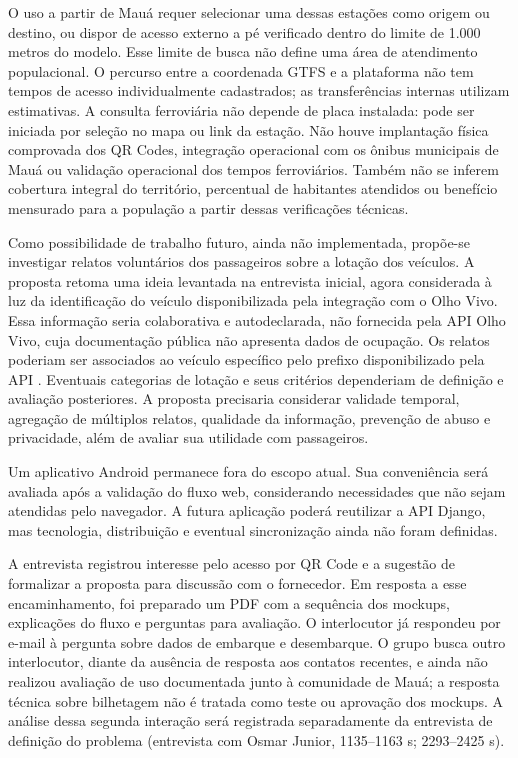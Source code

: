 \documentclass[12pt,oneside,a4paper,brazil,chapter=TITLE]{abntex2}
\begin{document}
O uso a partir de Mauá requer selecionar uma dessas estações como origem ou destino, ou dispor de acesso externo a pé verificado dentro do limite de 1.000 metros do modelo. Esse limite de busca não define uma área de atendimento populacional. O percurso entre a coordenada GTFS e a plataforma não tem tempos de acesso individualmente cadastrados; as transferências internas utilizam estimativas. A consulta ferroviária não depende de placa instalada: pode ser iniciada por seleção no mapa ou link da estação. Não houve implantação física comprovada dos QR Codes, integração operacional com os ônibus municipais de Mauá ou validação operacional dos tempos ferroviários. Também não se inferem cobertura integral do território, percentual de habitantes atendidos ou benefício mensurado para a população a partir dessas verificações técnicas.

Como possibilidade de trabalho futuro, ainda não implementada, propõe-se investigar relatos voluntários dos passageiros sobre a lotação dos veículos. A proposta retoma uma ideia levantada na entrevista inicial, agora considerada à luz da identificação do veículo disponibilizada pela integração com o Olho Vivo. Essa informação seria colaborativa e autodeclarada, não fornecida pela API Olho Vivo, cuja documentação pública não apresenta dados de ocupação. Os relatos poderiam ser associados ao veículo específico pelo prefixo disponibilizado pela API \citep{sptransapi}. Eventuais categorias de lotação e seus critérios dependeriam de definição e avaliação posteriores. A proposta precisaria considerar validade temporal, agregação de múltiplos relatos, qualidade da informação, prevenção de abuso e privacidade, além de avaliar sua utilidade com passageiros.

Um aplicativo Android permanece fora do escopo atual. Sua conveniência será avaliada após a validação do fluxo web, considerando necessidades que não sejam atendidas pelo navegador. A futura aplicação poderá reutilizar a API Django, mas tecnologia, distribuição e eventual sincronização ainda não foram definidas.

A entrevista registrou interesse pelo acesso por QR Code e a sugestão de formalizar a proposta para discussão com o fornecedor. Em resposta a esse encaminhamento, foi preparado um PDF com a sequência dos mockups, explicações do fluxo e perguntas para avaliação. O interlocutor já respondeu por e-mail à pergunta sobre dados de embarque e desembarque. O grupo busca outro interlocutor, diante da ausência de resposta aos contatos recentes, e ainda não realizou avaliação de uso documentada junto à comunidade de Mauá; a resposta técnica sobre bilhetagem não é tratada como teste ou aprovação dos mockups. A análise dessa segunda interação será registrada separadamente da entrevista de definição do problema  (entrevista com Osmar Junior, 1135--1163 s; 2293--2425 s).
\end{document}
